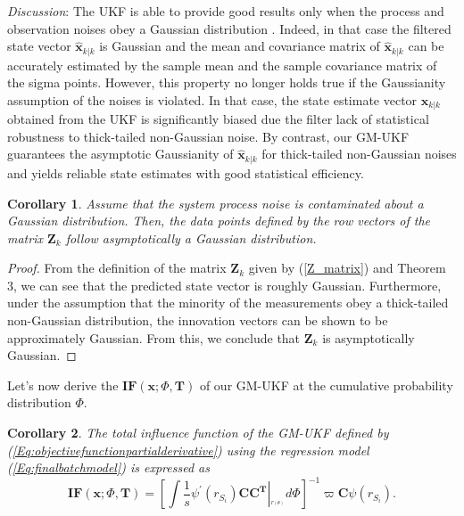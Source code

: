 \documentclass[10pt]{IEEEtran}
\newtheorem{corollary}{Corollary}[theorem]
\begin{document}
\emph{Discussion}: The UKF is able to provide good results only when the process and observation noises obey a Gaussian distribution \cite{Julier2000}. Indeed, in that case the filtered state vector ${\bm{\widehat {x}}_{k| {k}}}$ is Gaussian and the mean and covariance matrix of ${\bm{\widehat {x}}_{k| {k}}}$ can be accurately estimated by the sample mean and the sample covariance matrix of the sigma points. However, this property no longer holds true if the Gaussianity assumption of the noises is violated. In that case, the state estimate vector ${\bm{\widehat {x}}_{k| {k}}}$ obtained from the UKF is significantly biased due the filter lack of statistical robustness to thick-tailed non-Gaussian noise. By contrast, our GM-UKF guarantees the asymptotic Gaussianity of ${\bm{\widehat {x}}_{k| {k}}}$ for thick-tailed non-Gaussian noises and yields reliable state estimates with good statistical efficiency.

\begin{corollary}
Assume that the system process noise is contaminated about a Gaussian distribution. Then, the data points defined by the row vectors of the matrix $\bm{Z}_k$ follow asymptotically a Gaussian distribution.
\end{corollary}
\begin{proof}
From the definition of the matrix $\bm{Z}_k$ given by (\ref{Z_matrix}) and Theorem 3, we can see that the predicted state vector is roughly Gaussian. Furthermore, under the assumption that the minority of the measurements obey a thick-tailed non-Gaussian distribution, the innovation vectors can be shown to be approximately Gaussian. From this, we conclude that $\bm{Z}_k$ is asymptotically Gaussian.
\end{proof}

Let's now derive the $\bm{IF}(\bm{x};\Phi,\bm{T})$ of our GM-UKF at the cumulative probability distribution $\Phi$.

\begin{corollary}
The total influence function of the GM-UKF defined by (\ref{Eq:objectivefunctionpartialderivative}) using the regression model (\ref{Eq:finalbatchmodel}) is expressed as
\begin{equation}
\bm{IF}(\bm{x};\Phi,\bm{T}) = {\left[ {\int {\frac{1}{s}{\psi ^{'}}\left( {{r_{{S_i}}}} \right)\bm{C{C}^T}\left| {_{_{_{T\left(\Phi \right)}}}d\Phi} \right.} } \right]^{ - 1}}\varpi \bm{C}\psi \left( {{r_{{S_i}}}} \right).
\label{Eq:IFfinal}
\end{equation}
\end{corollary}
\end{document}
